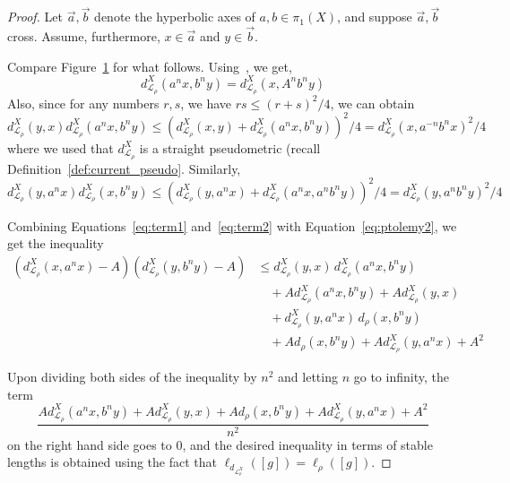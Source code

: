 \documentclass[12pt]{amsart}
\newcommand*{\svgfignormal}[1]{\fontsize{9pt}{8pt}\selectfont}
\numberwithin{equation}{section}
\numberwithin{figure}{section}
\theoremstyle{definition}
\theoremstyle{plain}
\newcommand{\ora}[1]{\overrightarrow{#1}}
\begin{document}
\begin{proof}
Let $\ora{a},\ora{b}$ denote the hyperbolic axes of $a,b \in \pi_1(X)$, and suppose $\ora{a},\ora{b}$ cross. Assume, furthermore, $x \in \ora{a}$ and $y \in \ora{b}$.

    \begin{figure}[h]
\svgfignormal{ptolemy}
    \caption{ }\label{fig:ptolemy}
\end{figure}

Compare Figure~\ref{fig:ptolemy} for what follows. 
Using~\cite[Lemma~8.12]{MGT25:Intersections}, we get, 
\[
d_{\mathcal{L}_\rho}^{X}(a^n x ,b^n y) = d_{\mathcal{L}_\rho}^{X}( x ,A^n b^n y)
\]
Also, since for any numbers $r,s$, we have $rs \leq (r+s)^2/4$, we can obtain
\begin{equation}
d_{\mathcal{L}_\rho}^{X}(y,x) d_{\mathcal{L}_\rho}^{X}(a^n x,b^n y) \leq (d_{\mathcal{L}_\rho}^{X}(x,y) + d_{\mathcal{L}_\rho}^{X}(a^n x,b^n y))^2/4 = d_{\mathcal{L}_\rho}^{X}(x,a^{-n}b^n x)^2/4
\label{eq:term1}
\end{equation}
where we used that $d_{\mathcal{L}_\rho}^{X}$ is a straight pseudometric (recall Definition~\ref{def:current_pseudo}.
Similarly,
\begin{equation}
d_{\mathcal{L}_\rho}^{X}(y,a^n x) d_{\mathcal{L}_\rho}^{X}(x,b^n y) \leq (d_{\mathcal{L}_\rho}^{X}(y,a^n x)+ d_{\mathcal{L}_\rho}^{X}(a^n x,a^n b^n y) )^2/4 = d_{\mathcal{L}_\rho}^{X}(y,a^{n}b^n y)^2/4
\label{eq:term2}
\end{equation}

Combining Equations~\ref{eq:term1} and~\ref{eq:term2} with Equation~\ref{eq:ptolemy2}, we get the inequality
\begin{equation*}
\begin{aligned}
(d_{\mathcal{L}_\rho}^{X}(x,a^n x)-A)(d_{\mathcal{L}_\rho}^{X}(y,b^n y)-A)
&\leq d_{\mathcal{L}_\rho}^{X}(y,x)\, d_{\mathcal{L}_\rho}^{X}(a^n x,b^n y) \\
&\quad + A d_{\mathcal{L}_\rho}^{X}(a^n x,b^n y)
+ A d_{\mathcal{L}_\rho}^{X}(y,x) \\
&\quad + d_{\mathcal{L}_\rho}^{X}(y,a^n x)\, d_{\rho}(x,b^n y) \\
&\quad + A d_{\rho}(x,b^n y)
+ A d_{\mathcal{L}_\rho}^{X}(y,a^n x) + A^2
\end{aligned}
\label{eq:ptolemy3}
\end{equation*}

Upon dividing both sides of the inequality by $n^2$ and letting $n$ go to infinity, the term
\[
\frac{A d_{\mathcal{L}_\rho}^{X}(a^n x,b^n y)
+ A d_{\mathcal{L}_\rho}^{X}(y,x) + Ad_{\rho}(x,b^n y)+Ad_{\mathcal{L}_\rho}^{X}(y,a^n x) + A^2}{n^2}
\]
on the right hand side goes to $0$, and the desired inequality in terms of stable lengths is obtained using the fact that $\ell_{d_{\mathcal{L}_\rho^X}}([g])=\ell_\rho([g])$.
\end{proof}
\end{document}
